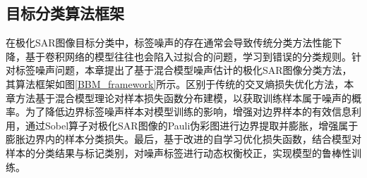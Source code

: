 

\subsection{目标分类算法框架}


在极化SAR图像目标分类中，标签噪声的存在通常会导致传统分类方法性能下降，基于卷积网络的模型往往也会陷入过拟合的问题，学习到错误的分类规则。针对标签噪声问题，本章提出了基于混合模型噪声估计的极化SAR图像分类方法，其算法框架如图\ref{BBM_framework}所示。区别于传统的交叉熵损失优化方法，本章方法基于混合模型理论对样本损失函数分布建模，以获取训练样本属于噪声的概率。为了降低边界标签噪声样本对模型训练的影响，增强对边界样本的有效信息利用，通过Sobel算子对极化SAR图像的Pauli伪彩图进行边界提取并膨胀，增强属于膨胀边界内的样本分类损失。最后，基于改进的自学习优化损失函数，结合模型对样本的分类结果与标记类别，对噪声标签进行动态权衡校正，实现模型的鲁棒性训练。

